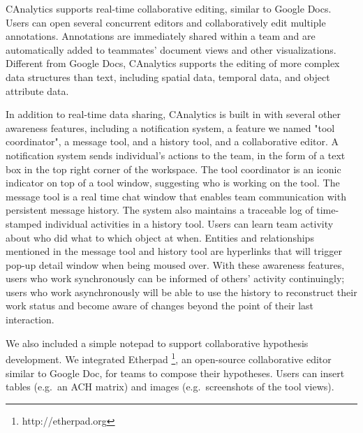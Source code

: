 CAnalytics supports real-time collaborative editing, similar to Google Docs.
Users can open several concurrent editors and collaboratively edit multiple
annotations. Annotations are immediately shared within a team and are
automatically added to teammates' document views and other visualizations.
Different from Google Docs, CAnalytics supports the editing of more complex data
structures than text, including spatial data, temporal data, and object
attribute data. 

In addition to real-time data sharing, CAnalytics is built in with
several other awareness features, including a notification system, a
feature we named "tool coordinator", a message tool, and a history
tool, and a collaborative editor. A notification system sends
individual's actions to the team, in the form of a text box in the top
right corner of the workspace. The tool coordinator is an iconic
indicator on top of a tool window, suggesting who is working on the
tool. The message tool is a real time chat window that enables team
communication with persistent message history. The system also maintains
a traceable log of time-stamped individual activities in a history tool.
Users can learn team activity about who did what to which object at
when. Entities and relationships mentioned in the message tool and
history tool are hyperlinks that will trigger pop-up detail window when
being moused over. With these awareness features, users who work
synchronously can be informed of others' activity continuingly; users
who work asynchronously will be able to use the history to reconstruct
their work status and become aware of changes beyond the point of their
last interaction.

We also included a simple notepad to support collaborative hypothesis
development. We integrated Etherpad \footnote{http://etherpad.org}, an
open-source collaborative editor similar to Google Doc, for teams to
compose their hypotheses. Users can insert tables (e.g.~an ACH matrix)
and images (e.g.~screenshots of the tool views).
